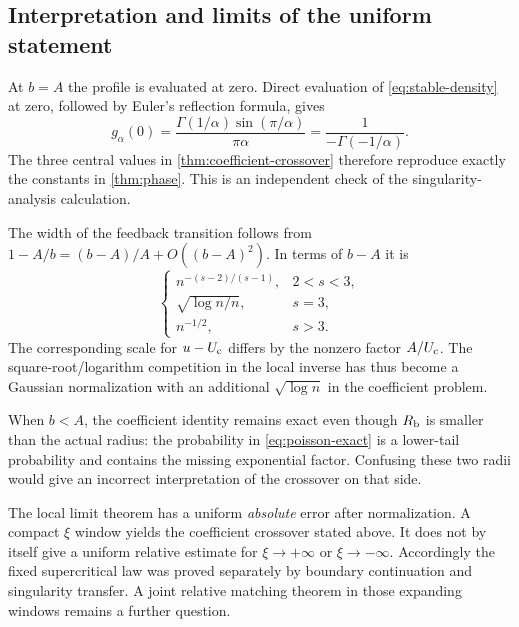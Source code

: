\subsection{Interpretation and limits of the uniform statement}

At $b=A$ the profile is evaluated at zero.  Direct evaluation of
\eqref{eq:stable-density} at zero, followed by Euler's reflection
formula, gives
\begin{equation}\label{eq:stable-zero}
 g_\alpha(0)=\frac{\Gamma(1/\alpha)\sin(\pi/\alpha)}{\pi\alpha}
             =\frac1{-\Gamma(-1/\alpha)}.
\end{equation}
The three central values in \cref{thm:coefficient-crossover}
therefore reproduce exactly the constants in
\cref{thm:phase}.  This is an independent check of the
singularity-analysis calculation.

The width of the feedback transition follows from
$1-A/b=(b-A)/A+O((b-A)^2)$.  In terms of $b-A$ it is
\begin{equation}\label{eq:window-widths}
 \begin{cases}
  n^{-(s-2)/(s-1)},&2<s<3,\\
  \sqrt{\log n/n},&s=3,\\
  n^{-1/2},&s>3.
 \end{cases}
\end{equation}
The corresponding scale for $u-U_{\mathrm c}$ differs by the nonzero factor
$A/U_{\mathrm c}$.  The square-root/logarithm competition in the local
inverse has thus become a Gaussian normalization with an additional
$\sqrt{\log n}$ in the coefficient problem.

When $b<A$, the coefficient identity remains exact even though
$R_{\mathrm b}$ is smaller than the actual radius: the probability in
\eqref{eq:poisson-exact} is a lower-tail probability and contains
the missing exponential factor.  Confusing these two radii would
give an incorrect interpretation of the crossover on that side.

The local limit theorem has a uniform \emph{absolute} error after
normalization.  A compact $\xi$ window yields the coefficient
crossover stated above.  It does not by itself give a uniform
relative estimate for $\xi\to+\infty$ or $\xi\to-\infty$.
Accordingly the fixed supercritical law was proved separately by
boundary continuation and singularity transfer.  A joint relative
matching theorem in those expanding windows remains a further
question.
